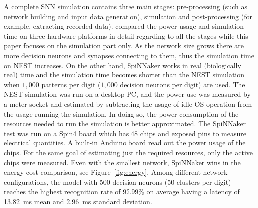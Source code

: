 \documentclass{frontiersENG} %
\begin{document}
A complete SNN simulation contains three main stages: pre-processing (such as network building and input data generation), simulation and post-processing (for example, extracting recorded data).
\citet{Diamond2016comparing} compared the power usage and simulation time on three hardware platforms in detail regarding to all the stages while this paper focuses on the simulation part only.
As the network size grows there are more decision neurons and synapses connecting to them, thus the simulation time on NEST increases.
On the other hand, SpiNNaker works in real (biologically real) time and the simulation time becomes shorter than the NEST simulation when $1,000$ patterns per digit ($1,000$ decision neurons per digit) are used.
The NEST simulation was run on a desktop PC, and the power use was measured by a meter socket and estimated by subtracting the usage of idle OS operation from the usage running the simulation.
In doing so, the power consumption of the resources needed to run the simulation is better approximated.
The SpiNNaker test was run on a Spin4 board which has 48 chips and exposed pins to measure electrical quantities.
A built-in Anduino board read out the power usage of the chips.
For the same goal of estimating just the required resources, only the active chips were measured.
Even with the smallest network, SpiNNaker wins in the energy cost comparison, see Figure~\ref{fig:energy}.
Among different network configurations, the model with 500 decision neurons (50 clusters per digit) reaches the highest recognition rate of 92.99\% on average having a latency of 13.82~ms mean and 2.96~ms standard deviation.
\end{document}
